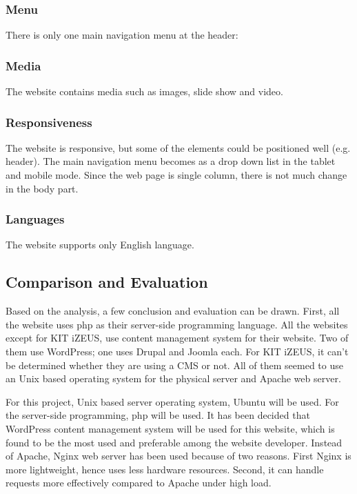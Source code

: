 \subsubsection*{Menu}
There is only one main navigation menu at the header:

\subsubsection*{Media}
The website contains media such as images, slide show and video.

\subsubsection*{Responsiveness}
The website is responsive, but some of the elements could be positioned well (e.g. header). The main navigation menu becomes as a drop down list in the tablet and mobile mode. Since the web page is single column, there is not much change in the body part.

\subsubsection*{Languages}
The website supports only English language.

\subsection{Comparison and Evaluation}
Based on the analysis, a few conclusion and evaluation can be drawn. First, all the website uses \ac{php} as their server-side programming language. All the websites except for KIT iZEUS, use content management system for their website. Two of them use WordPress; one uses Drupal and Joomla each. For KIT iZEUS, it can't be determined whether they are using a CMS or not. All of them seemed to use an Unix based operating system for the physical server and Apache web server.

For this project, Unix based server operating system, Ubuntu will be used. For the server-side programming, \ac{php} will be used. It has been decided that WordPress content management system will be used for this website, which is found to be the most used and preferable among the website developer. Instead of Apache, Nginx web server has been used because of two reasons. First Nginx is more lightweight, hence uses less hardware resources. Second, it can handle requests more effectively compared to Apache under high load.

